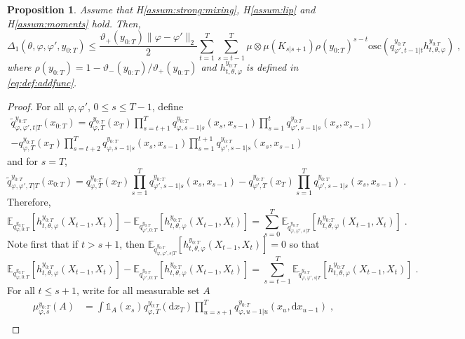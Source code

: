\documentclass{article}
\newtheorem{proposition}[theorem]{Proposition}
\newcommand{\udlowvar}{\vartheta_-}
\newcommand{\udupvar}{\vartheta_+}
\newcommand{\1}{\mathbbm{1}}
\newcommand{\rmd}{\ensuremath{\mathrm{d}}}
\newcommand{\eqsp}{\;}
\begin{document}
\begin{proposition}
Assume that H\ref{assum:strong:mixing}, H\ref{assum:lip} and H\ref{assum:moments} hold. Then,
$$
\Delta_1(\theta, \varphi, \varphi', y_{0:T}) \leq \frac{ \udupvar(y_{0:T})\|\varphi-\varphi'\|_2}{2}\sum_{t=1}^T\sum_{s=t-1}^T\mu\otimes\mu (K_{s|s+1}) \rho(y_{0:T})^{s-t}\mathrm{osc}\left(q^{y_{0:T}}_{\varphi',t-1|t}h^{y_{0:T}}_{t,\theta,\varphi}\right) \eqsp,
$$
where $\rho(y_{0:T}) = 1-\udlowvar(y_{0:T})/\udupvar(y_{0:T})$ and $h^{y_{0:T}}_{t,\theta,\varphi}$ is defined in \eqref{eq:def:addfunc}.
\end{proposition}
\begin{proof}
For all $\varphi,\varphi'$, $0\leq s \leq T-1$, define
\begin{multline*}
\tilde q^{y_{0:T}}_{\varphi,\varphi',t|T}(x_{0:T}) = q^{y_{0:T}}_{\varphi,T}(x_T)\prod_{s=t+1}^Tq^{y_{0:T}}_{\varphi,s-1|s}(x_s,x_{s-1})\prod_{s=1}^tq^{y_{0:T}}_{\varphi',s-1|s}(x_s,x_{s-1}) \\
- q^{y_{0:T}}_{\varphi,T}(x_T)\prod_{s=t+2}^Tq^{y_{0:T}}_{\varphi,s-1|s}(x_s,x_{s-1})\prod_{s=1}^{t+1}q^{y_{0:T}}_{\varphi',s-1|s}(x_s,x_{s-1})
\end{multline*}
and for $s=T$,
$$
\tilde q^{y_{0:T}}_{\varphi,\varphi',T|T}(x_{0:T}) = q^{y_{0:T}}_{\varphi,T}(x_T)\prod_{s=1}^Tq^{y_{0:T}}_{\varphi',s-1|s}(x_s,x_{s-1}) 
- q^{y_{0:T}}_{\varphi',T}(x_T)\prod_{s=1}^Tq^{y_{0:T}}_{\varphi',s-1|s}(x_s,x_{s-1})\eqsp.
$$
Therefore,
$$
\mathbb{E}_{q^{y_{0:T}}_{\varphi,0:T}}\left[h^{y_{0:T}}_{t,\theta,\varphi}(X_{t-1},X_t)\right] - \mathbb{E}_{q^{y_{0:T}}_{\varphi',0:T}}\left[h^{y_{0:T}}_{t,\theta,\varphi}(X_{t-1},X_t)\right] = \sum_{s=0}^T \mathbb{E}_{\tilde q^{y_{0:T}}_{\varphi,\varphi',s|T}}\left[h^{y_{0:T}}_{t,\theta,\varphi}(X_{t-1},X_t)\right] \eqsp.
$$
Note first that if $t> s+1$, then $\mathbb{E}_{\tilde q^{y_{0:T}}_{\varphi,\varphi',s|T}}\left[h^{y_{0:T}}_{t,\theta,\varphi}(X_{t-1},X_t)\right] = 0$ so that
$$
\mathbb{E}_{q^{y_{0:T}}_{\varphi,0:T}}\left[h^{y_{0:T}}_{t,\theta,\varphi}(X_{t-1},X_t)\right] - \mathbb{E}_{q^{y_{0:T}}_{\varphi',0:T}}\left[h^{y_{0:T}}_{t,\theta,\varphi}(X_{t-1},X_t)\right] = \sum_{s=t-1}^T \mathbb{E}_{\tilde q^{y_{0:T}}_{\varphi,\varphi',s|T}}\left[h^{y_{0:T}}_{t,\theta,\varphi}(X_{t-1},X_t)\right] \eqsp.
$$
For all $t\leq s+1$, write for all measurable set $A$
\begin{align*}
\mu^{y_{0:T}}_{\varphi,s}(A) &= \int \mathds{1}_A(x_s) q^{y_{0:T}}_{\varphi,T}(\rmd x_T)\prod_{u=s+1}^Tq^{y_{0:T}}_{\varphi,u-1|u}(x_u,\rmd x_{u-1})\eqsp,\\

\end{align*}
\end{proof}
\end{document}
